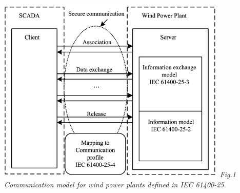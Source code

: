 \documentclass[twosided,a4,10pt]{article}
\begin{document}
\begin{multicols}{2}
  	\includegraphics[scale=0.65]{IECProtocol.png}
  	\textit{Fig.1 Communication model for wind power plants defined in IEC 61400-25.} \newline

\end{multicols}
\end{document}
